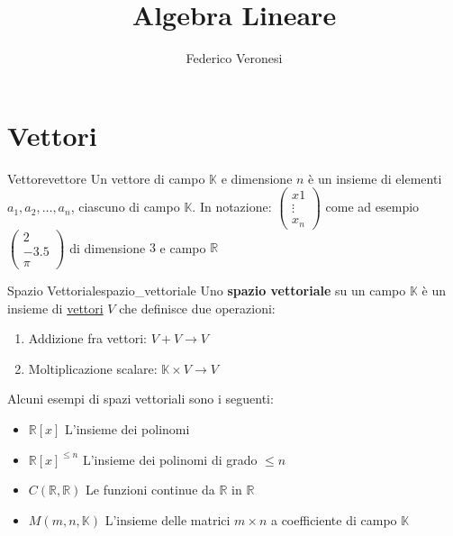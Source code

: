 \documentclass{article}
\title{Algebra Lineare}
\author{Federico Veronesi}
\begin{document}
\maketitle

{
    \hypersetup{linkcolor=black}
    \tableofcontents
}

\section{Vettori}

\begin{definition}{Vettore}{vettore}
    Un vettore di campo $\mathbb{K}$ e dimensione $n$ è un insieme di elementi $a_1, a_2, \dots , a_n$, ciascuno di campo $\mathbb{K}$. In notazione: $\begin{pmatrix} x1 \\ \vdots \\ x_n \end{pmatrix}$ come ad esempio $\begin{pmatrix} 2 \\ -3.5 \\ \pi \end{pmatrix}$ di dimensione $3$ e campo $\mathbb{R}$
\end{definition}

\begin{definition}{Spazio Vettoriale}{spazio_vettoriale}
    Uno \textbf{spazio vettoriale} su un campo $\mathbb{K}$ è un insieme di \hyperref[def:vettore]{vettori} $V$ che definisce due operazioni:
    \begin{enumerate}
        \item Addizione fra vettori: $V + V \to V$
        \item Moltiplicazione scalare: $\mathbb{K} \times V \to V$
    \end{enumerate}
\end{definition}

Alcuni esempi di spazi vettoriali sono i seguenti:
\begin{itemize}
    \item $\mathbb{R} [x]$ L'insieme dei polinomi
    \item $\mathbb{R} [x]^{\le n}$ L'insieme dei polinomi di grado $\le n$
    \item $C(\mathbb{R}, \mathbb{R})$ Le funzioni continue da $\mathbb{R}$ in $\mathbb{R}$
    \item $M(m, n, \mathbb{K})$ L'insieme delle matrici $m \times n$ a coefficiente di campo $\mathbb{K}$
\end{itemize}
\end{document}
